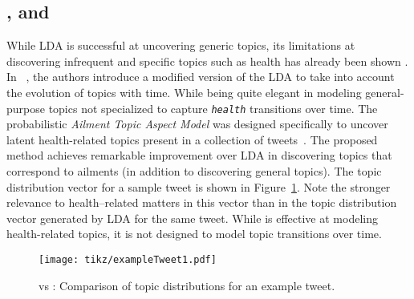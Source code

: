 \subsection{\lda, \tmlda and \atam}
While LDA is successful at uncovering generic topics, its limitations at discovering
infrequent and specific topics such as health has already been shown \cite{atam2,prier2011identifying}.
In ~\cite{DBLP:conf/kdd/WangAB12}, the authors introduce a modified version of the
LDA to take into account the evolution of topics with time.
While being quite elegant in modeling general-purpose topics \tmlda
not specialized to capture \texttt{\emph{health}} transitions over time.
The probabilistic \emph{Ailment Topic Aspect Model} was designed 
specifically to uncover latent health-related topics present in a 
collection of tweets~\cite{atam2}. The proposed method achieves
remarkable improvement over LDA in discovering topics that correspond to 
ailments (in addition to discovering general topics).
The topic distribution vector for a sample tweet is shown 
in Figure~\ref{fig:ldavsatam}. Note the stronger relevance to 
health--related matters in this vector than in the topic distribution vector 
generated by LDA for the same tweet. While \atam is effective at modeling health-related topics, 
it is not designed to model topic transitions over time. 
\begin{figure}[t!]
\centering
\texttt{[image: tikz/exampleTweet1.pdf]}
\caption{\lda vs \atam: Comparison of topic distributions for an example tweet.}
\label{fig:ldavsatam}
\end{figure}
